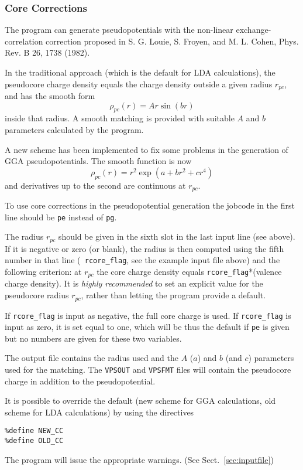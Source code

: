 \documentclass[11pt]{article}
\begin{document}
\subsubsection{Core Corrections}
\label{sec:cc}
The program can generate pseudopotentials with the non-linear
exchange-correlation correction proposed in S. G. Louie, S. Froyen,
and M. L. Cohen, Phys. Rev. B 26, 1738 (1982).

In the traditional approach (which is the default for LDA
calculations), the pseudocore charge density equals the charge density
outside a given radius $r_{pc}$, and has the smooth form
$$
\rho_{pc}(r) = A r   \sin(b r)
$$
inside that radius. A smooth matching is provided with suitable $A$ 
and $b$ parameters calculated by the program.

A new scheme has been implemented to fix some problems in the generation
of GGA pseudopotentials. The smooth function is now
$$
\rho_{pc}(r) =  r^2  \exp{(a + b r^2 +c r^4)}
$$
and derivatives up to the second are continuous  at $r_{pc}$.

To use core corrections in the pseudopotential generation
the jobcode in the first line should be {\tt pe} instead of {\tt pg}.

The radius $r_{pc}$ should be  given in the sixth slot in the last
input line (see above). If it is negative or zero (or blank), the
radius is then computed using the fifth number in that line ({\tt
rcore\_flag}, see the example input file above)
and the following criterion: at $r_{pc}$ the core charge density 
equals {\tt rcore\_flag}*(valence charge density).
It is {\it highly recommended} to set an explicit value for the pseudocore
radius $r_{pc}$, rather than letting the program provide a default.

If {\tt rcore\_flag} is input as negative, the full core charge is used.
If {\tt rcore\_flag} is input as zero, it is set equal to one, which will be
thus the default if {\tt pe} is given but no numbers are given for these
two variables.

The output file contains the radius used and the $A$ ($a$) and $b$ (and $c$)
parameters used for the matching. The {\tt VPSOUT} and {\tt VPSFMT}
files will  contain the pseudocore charge in addition to the pseudopotential.

It is possible to override the default (new scheme for GGA
calculations, old scheme for LDA calculations) by using the directives
\begin{verbatim}
%define NEW_CC
%define OLD_CC
\end{verbatim}
The program will issue the appropriate warnings. (See Sect.~\ref{sec:inputfile})
\end{document}
